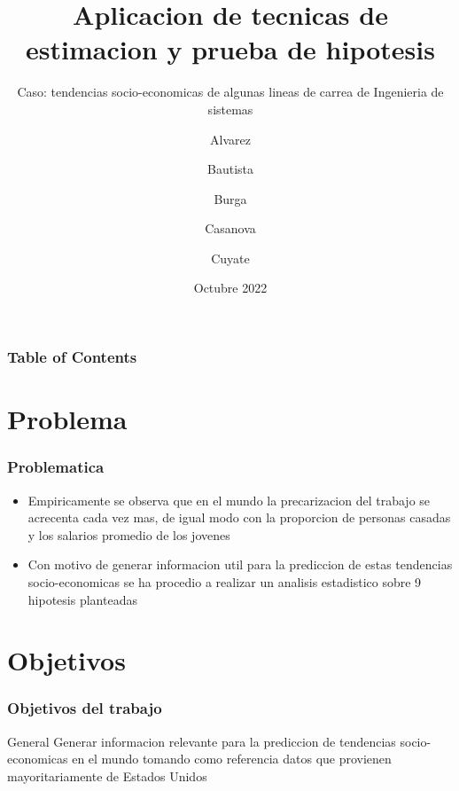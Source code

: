 \documentclass{beamer}
\title[PC1 Estadistica Aplicada] %
{Aplicacion de tecnicas de estimacion y prueba de hipotesis}
\subtitle{
  Caso: tendencias socio-economicas de algunas
  lineas de carrea de Ingenieria de sistemas
}
\author %
{
  Alvarez \and Bautista \and Burga \and
  Casanova \and  Cuyate
}
\institute
{
  Facultad de Ingenieria Industrial y de Sistemas\\
  \textbf{Universidad Nacional de Ingenieria}
}
\date
{Octubre 2022}
\begin{document}
\frame{\titlepage}


\begin{frame}
\frametitle{Table of Contents}
\tableofcontents
\end{frame}

\section{Problema}

\begin{frame}
\frametitle{Problematica}

\begin{itemize}
    \item Empiricamente se observa que en el mundo la precarizacion del trabajo
se acrecenta cada vez mas, de igual modo con la proporcion de personas
casadas y los salarios promedio de los jovenes
    \item Con motivo de generar informacion util para la prediccion de estas tendencias
socio-economicas se ha procedio a realizar un analisis estadistico sobre
9 hipotesis planteadas

\end{itemize}
\end{frame}



\section{Objetivos}

\begin{frame}

\frametitle{Objetivos del trabajo}

\begin{alertblock}{General}
  Generar informacion relevante para la prediccion de tendencias
  socio-economicas en el mundo tomando como referencia datos
  que provienen mayoritariamente de Estados Unidos
\end{alertblock}
\end{frame}
\end{document}
